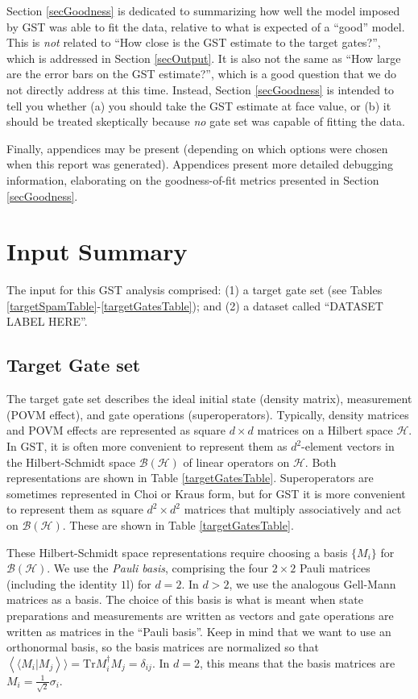 \documentclass{article}[11pt]
\newcommand{\rrangle}{\rangle\!\rangle} \newcommand{\llangle}{\langle\!\langle}
\newcommand{\sbraket}[2]{\ensuremath{\left\llangle#1|#2\right\rrangle}}
\def\Id{1\!\mathrm{l}}
\newcommand{\Tr}[0]{\mathrm{Tr}}
\newcommand{\putfield}[2]{#2}
\begin{document}
Section \ref{secGoodness} is dedicated to summarizing how well the model imposed by GST was able to fit the data, relative to what is expected of a ``good'' model.  This is \emph{not} related to ``How close is the GST estimate to the target gates?'', which is addressed in Section \ref{secOutput}.  It is also not the same as ``How large are the error bars on the GST estimate?'', which is a good question that we do not directly address at this time.  Instead, Section \ref{secGoodness} is intended to tell you whether (a) you should take the GST estimate at face value, or (b) it should be treated skeptically because \emph{no} gate set was capable of fitting the data.

Finally, appendices may be present (depending on which options were chosen when this report was generated).  Appendices present more detailed debugging information, elaborating on the goodness-of-fit metrics presented in Section \ref{secGoodness}.

\section{Input Summary\label{secInput}}
The input for this GST analysis comprised: (1) a target gate set (see Tables \ref{targetSpamTable}-\ref{targetGatesTable}); and (2) a dataset called ``\putfield{datasetLabel}{DATASET LABEL HERE}''.

\subsection{Target Gate set}

The target gate set describes the ideal initial state (density matrix), measurement (POVM effect), and gate operations (superoperators).  Typically, density matrices and POVM effects are represented as square $d\times d$ matrices on a Hilbert space $\mathcal{H}$.  In GST, it is often more convenient to represent them as $d^2$-element vectors in the Hilbert-Schmidt space $\mathcal{B}(\mathcal{H})$ of linear operators on $\mathcal{H}$.  Both representations are shown in Table \ref{targetGatesTable}.  Superoperators are sometimes represented in Choi or Kraus form, but for GST it is more convenient to represent them as square $d^2\times d^2$ matrices that multiply associatively and act on $\mathcal{B}(\mathcal{H})$.  These are shown in Table \ref{targetGatesTable}.

These Hilbert-Schmidt space representations require choosing a basis $\{M_i\}$ for $\mathcal{B}(\mathcal{H})$.  We use the \emph{Pauli basis}, comprising the four $2\times2$ Pauli matrices (including the identity $\Id$) for $d=2$.  In $d>2$, we use the analogous Gell-Mann matrices as a basis.   The choice of this basis is what is meant when state preparations and measurements are written as vectors and gate operations are written as matrices in the ``Pauli basis''.  Keep in mind that we want to use an orthonormal basis, so the basis matrices are normalized so that $\sbraket{M_i}{M_j} = \Tr M_i^\dagger M_j = \delta_{ij}$.  In $d=2$, this means that the basis matrices are $M_i = \frac{1}{\sqrt{2}}\sigma_i$.
\end{document}
